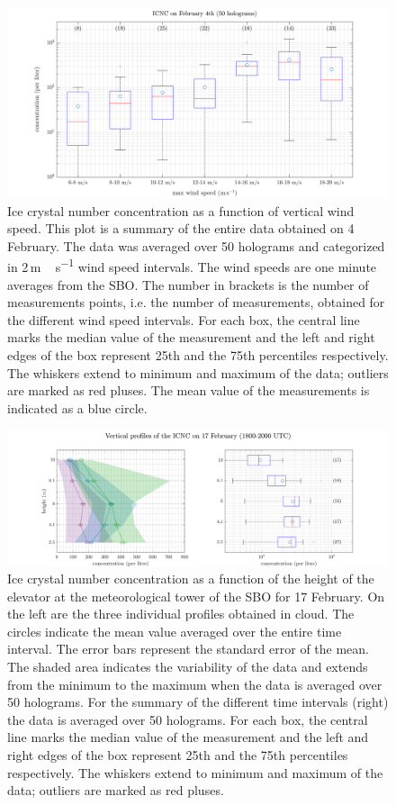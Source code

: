 \documentclass[draft,linenumbers]{agujournal}
\begin{document}
{\begin{figure}[h]
 \centering
 	\includegraphics[width=14cm]{0402_WSMax.png}
 \caption{Ice crystal number concentration as a function of vertical wind speed. This plot is a summary of the entire data obtained on 4 February. The data was averaged over 50 holograms and categorized in 2\,\si{m\,s^{-1}} wind speed intervals. The wind speeds are one minute averages from the SBO. The number in brackets is the number of measurements points, i.e. the number of measurements, obtained for the different wind speed intervals. For each box, the central line marks the median value of the measurement and the left and right edges of the box represent 25th and the 75th percentiles respectively. The whiskers extend to minimum and maximum of the data; outliers are marked as red pluses. The mean value of the measurements is indicated as a blue circle.}
 \label{fig:ICNCvsWSMAX0402}
\end{figure}

\begin{figure}[h]
 \centering
 	\includegraphics[width=14cm]{1702_Overview.png}
 \caption{Ice crystal number concentration as a function of the height of the elevator at the meteorological tower of the SBO for 17 February. On the left are the three individual profiles obtained in cloud. The circles indicate the mean value averaged over the entire time interval. The error bars represent the standard error of the mean. The shaded area indicates the variability of the data and extends from the minimum to the maximum when the data is averaged over 50 holograms. For the summary of the different time intervals (right) the data is averaged over 50 holograms. For each box, the central line marks the median value of the measurement and the left and right edges of the box represent 25th and the 75th percentiles respectively. The whiskers extend to minimum and maximum of the data; outliers are marked as red pluses.}
 \label{fig:profiles1702}
\end{figure}

}
\end{document}

